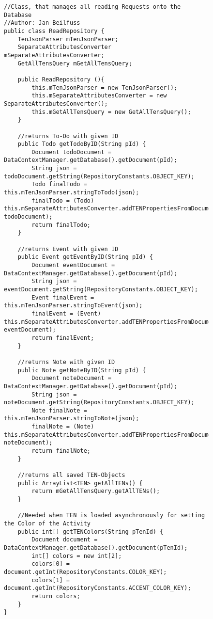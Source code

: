 \begin{figure}[H]
\begin{lstlisting}[caption=ReadRepository (Jan Beilfuß)]
//Class, that manages all reading Requests onto the Database
//Author: Jan Beilfuss
public class ReadRepository {
    TenJsonParser mTenJsonParser;
    SeparateAttributesConverter mSeparateAttributesConverter;
    GetAllTensQuery mGetAllTensQuery;

    public ReadRepository (){
        this.mTenJsonParser = new TenJsonParser();
        this.mSeparateAttributesConverter = new SeparateAttributesConverter();
        this.mGetAllTensQuery = new GetAllTensQuery();
    }

    //returns To-Do with given ID
    public Todo getTodoByID(String pId) {
        Document todoDocument = DataContextManager.getDatabase().getDocument(pId);
        String json = todoDocument.getString(RepositoryConstants.OBJECT_KEY);
        Todo finalTodo = this.mTenJsonParser.stringToTodo(json);
        finalTodo = (Todo) this.mSeparateAttributesConverter.addTENPropertiesFromDocument(finalTodo, todoDocument);
        return finalTodo;
    }

    //returns Event with given ID
    public Event getEventByID(String pId) {
        Document eventDocument = DataContextManager.getDatabase().getDocument(pId);
        String json = eventDocument.getString(RepositoryConstants.OBJECT_KEY);
        Event finalEvent = this.mTenJsonParser.stringToEvent(json);
        finalEvent = (Event) this.mSeparateAttributesConverter.addTENPropertiesFromDocument(finalEvent, eventDocument);
        return finalEvent;
    }

    //returns Note with given ID
    public Note getNoteByID(String pId) {
        Document noteDocument = DataContextManager.getDatabase().getDocument(pId);
        String json = noteDocument.getString(RepositoryConstants.OBJECT_KEY);
        Note finalNote = this.mTenJsonParser.stringToNote(json);
        finalNote = (Note) this.mSeparateAttributesConverter.addTENPropertiesFromDocument(finalNote, noteDocument);
        return finalNote;
    }

    //returns all saved TEN-Objects
    public ArrayList<TEN> getAllTENs() {
        return mGetAllTensQuery.getAllTENs();
    }

    //Needed when TEN is loaded asynchronously for setting the Color of the Activity
    public int[] getTENColors(String pTenId) {
        Document document = DataContextManager.getDatabase().getDocument(pTenId);
        int[] colors = new int[2];
        colors[0] = document.getInt(RepositoryConstants.COLOR_KEY);
        colors[1] = document.getInt(RepositoryConstants.ACCENT_COLOR_KEY);
        return colors;
    }
}
\end{lstlisting}
\end{figure}


